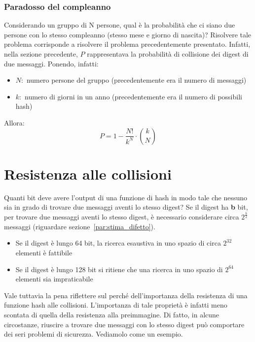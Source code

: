\subsubsection{Paradosso del compleanno}
Considerando un gruppo di N persone, qual è la probabilità che ci siano due persone con lo stesso compleanno (stesso mese e giorno di nascita)? Risolvere tale problema corrisponde a risolvere il problema precedentemente presentato. Infatti, nella sezione precedente, $P$ rappresentava la probabilità di collisione dei digest di due messaggi. Ponendo, infatti:
\begin{itemize}
\item $N:$ numero persone del gruppo (precedentemente era il numero di messaggi)
\item $k:$ numero di giorni in un anno (precedentemente era il numero di possibili hash)
\end{itemize}
Allora:
\begin{equation}
P = 1 - \frac{N!}{k^{N}} \cdot \binom {k}{N}
\end{equation}

\section{Resistenza alle collisioni} \label{par:collisioni}
Quanti bit deve avere l'output di una funzione di hash in modo tale che nessuno sia in grado di trovare due messaggi aventi lo stesso digest? 
\newline \newline
Se il digest ha \textbf{b} bit, per trovare due messaggi aventi lo stesso digest, è necessario considerare circa $2^{\frac{b}{2}}$ messaggi (riguardare sezione~\ref{par:stima_difetto}). 
\begin{itemize}
\item Se il digest è lungo 64 bit, la ricerca esaustiva in uno spazio di circa $2^{32}$ elementi è fattibile
\item Se il digest è lungo 128 bit si ritiene che una ricerca in uno spazio di $2^{64}$ elementi sia impraticabile
\end{itemize}

Vale tuttavia la pena riflettere sul perché dell'importanza della resistenza di una funzione hash alle collisioni. L'importanza di tale proprietà è infatti meno scontata di quella della resistenza alla preimmagine.
Di fatto, in alcune circostanze, riuscire a trovare due messaggi con lo stesso digest può comportare dei seri problemi di sicurezza. Vediamolo come un esempio.

